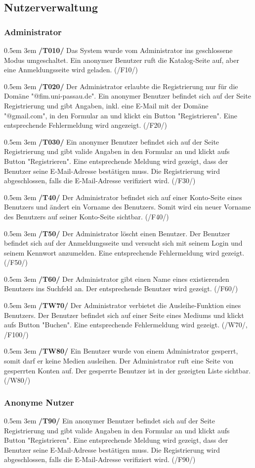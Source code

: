 \documentclass{article}
\newcommand{\specification}[3]{
	{\parindent 0.5em \hangindent 3em \hypertarget{spec:#1:#2}{\textbf{/#1#2/}} #3 \par \nobreak \vspace*{0.5em}}
}
\begin{document}
\subsection{Nutzerverwaltung}
		\subsubsection{Administrator}
			\specification{T}{010}{Das System wurde vom Administrator ins geschlossene Modus umgeschaltet. Ein anonymer Benutzer ruft die Katalog-Seite auf, aber eine Anmeldungsseite wird geladen.­­­­­ (/F10/)}
			\specification{T}{020}{Der Administrator erlaubte die Registrierung nur für die Domäne "@fim.uni-passau.de". Ein anonymer Benutzer befindet sich auf der Seite Registrierung und gibt Angaben, inkl. eine E-Mail mit der Domäne "@gmail.com", in den Formular an und klickt ein Button "Registrieren". Eine entsprechende Fehlermeldung wird angezeigt. (/F20/)}
			\specification{T}{030}{Ein anonymer Benutzer befindet sich auf der Seite Registrierung und gibt valide Angaben in den Formular an und klickt aufs Button "Registrieren". Eine entsprechende Meldung wird gezeigt, dass der Benutzer seine E-Mail-Adresse bestätigen muss. Die Registrierung wird abgeschlossen, falls die E-Mail-Adresse verifiziert wird. (/F30/)}
			\specification{T}{40}{Der Administrator befindet sich auf einer Konto-Seite eines Benutzers und ändert ein Vorname des Benutzers. Somit wird ein neuer Vorname des Benutzers auf seiner Konto-Seite sichtbar. (/F40/)}
			\specification{T}{50}{Der Administrator löscht einen Benutzer. Der Benutzer befindet sich auf der Anmeldungsseite und versucht sich mit seinem Login und seinem Kennwort anzumelden. Eine entsprechende Fehlermeldung wird gezeigt. (/F50/)} 
			\specification{T}{60}{Der Administrator gibt einen Name eines existierenden Benutzers ins Suchfeld an. Der entsprechende Benutzer wird gezeigt. (/F60/)}
			\specification{TW}{70}{Der Administrator verbietet die Ausleihe-Funktion eines Benutzers. Der Benutzer befindet sich auf einer Seite eines Mediums und klickt aufs Button "Buchen". Eine entsprechende Fehlermeldung wird gezeigt. (/W70/, /F100/)}
			\specification{TW}{80}{Ein Benutzer wurde von einem Administrator gesperrt, somit darf er keine Medien ausleihen. Der Administrator ruft eine Seite von gesperrten Konten auf. Der gesperrte Benutzer ist in der gezeigten Liste sichtbar. (/W80/)}
			\subsubsection{Anonyme Nutzer}
			\specification{T}{90}{Ein anonymer Benutzer befindet sich auf der Seite Registrierung und gibt valide Angaben in den Formular an und klickt aufs Button "Registrieren". Eine entsprechende Meldung wird gezeigt, dass der Benutzer seine E-Mail-Adresse bestätigen muss. Die Registrierung wird abgeschlossen, falls die E-Mail-Adresse verifiziert wird. (/F90/)}
\end{document}
